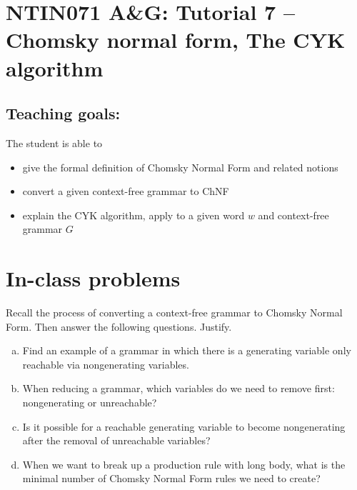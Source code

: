 \documentclass[a4paper,12pt]{amsart}
\begin{document}
\thispagestyle{empty}

\section*{NTIN071 A\&G: Tutorial 7 -- Chomsky normal form, The CYK algorithm}

\medskip

\subsection*{Teaching goals:} The student is able to

    \begin{itemize}\setlength{\itemsep}{0pt}
        \item give the formal definition of Chomsky Normal Form and related notions
        \item convert a given context-free grammar to ChNF
        \item explain the CYK algorithm, apply to a given word $w$ and context-free grammar $G$
    \end{itemize}

\medskip

\section*{In-class problems}


\medskip\begin{problem}
    
    Recall the process of converting a context-free grammar to Chomsky Normal Form. Then answer the following questions. Justify.
    
    \begin{enumerate}[(a)]\setlength{\itemsep}{6pt}
        \item Find an example of a grammar in which there is a generating variable only reachable via nongenerating variables.
        \item When reducing a grammar, which variables do we need to remove first: nongenerating or unreachable?
        \item Is it possible for a reachable generating variable to become nongenerating after the removal of unreachable variables?
        \item When we want to break up a production rule with long body, what is the minimal number of Chomsky Normal Form rules we need to create?
    \end{enumerate}

\end{problem}
\end{document}
